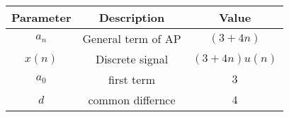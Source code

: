 \begin{tabular}{|c|c|c|}
\hline
     \textbf{Parameter} & \textbf{Description} & \textbf{Value} \\
     \hline
     $a_n$ & General term of AP & $(3 +4n)$\\
     \hline
     $x(n)$ & Discrete signal & $(3+4n)u(n)$\\
     \hline
     $a_0$ & first term & $3$\\
     \hline
     $d$ & common differnce & $4$ \\
     \hline
\end{tabular}
